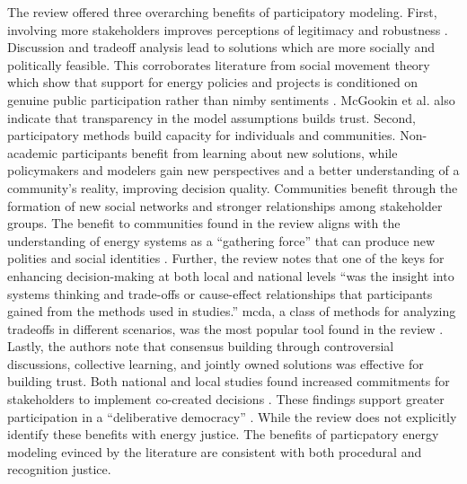 The review offered three overarching benefits of participatory modeling. First,
involving more stakeholders improves perceptions of legitimacy and robustness
\cite{mcgookin_participatory_2021}. Discussion and tradeoff analysis lead to
solutions which are more socially and politically feasible. This corroborates
literature from social movement theory which show that support for energy policies
and projects is conditioned on genuine public participation rather than
\ac{nimby} sentiments \cite{summers_influencing_2020,ottinger_procedural_2014,
walker_procedural_2017,barragan-contreras_procedural_2022,gonyo_resident_2021,konisky_proximity_2021}.
McGookin et al. also indicate that transparency in the model assumptions builds
trust.
Second, participatory methods build capacity for individuals and communities.
Non-academic participants benefit from learning about new solutions, while
policymakers and modelers gain new perspectives and a better understanding of a
community's reality, improving decision quality. Communities benefit through the
formation of new social networks and stronger relationships among stakeholder
groups. The benefit to communities found in the review aligns with the
understanding of energy systems as a ``gathering force'' that can produce new
polities and social identities \cite{bridge_energy_2018}. Further, the review
notes that one of the keys for enhancing decision-making at both local and
national levels ``was the insight into systems thinking and trade-offs or
cause-effect relationships that participants gained from the methods used in
studies.'' \ac{mcda}, a class of methods for analyzing tradeoffs in different
scenarios, was the most popular tool found in the review
\cite{mcgookin_participatory_2021}. Lastly, the authors note that consensus
building through controversial discussions, collective learning, and jointly
owned solutions was effective for building trust. Both national and local
studies found increased commitments for stakeholders to implement co-created
decisions \cite{mcgookin_participatory_2021}. These findings support greater
participation in a ``deliberative democracy'' \cite{dryzek_deliberative_2013}.
While the review does not explicitly identify these benefits with energy
justice. The benefits of particpatory energy modeling evinced by the literature
are consistent with both procedural and recognition justice.



